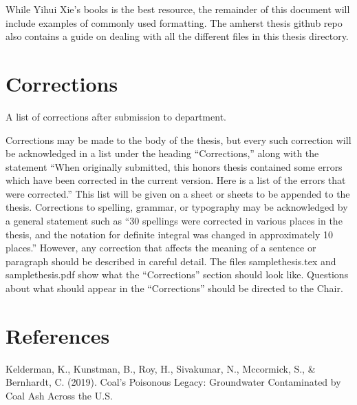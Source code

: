 \documentclass[12pt, twoside]{amherstthesis}
\newlength{\cslhangindent}
\newenvironment{cslreferences}%
  {\setlength{\parindent}{0pt}%
  \everypar{\setlength{\hangindent}{\cslhangindent}}\ignorespaces}%
  {\par}
\begin{document}
While Yihui Xie's books is the best resource, the remainder of this document will include examples of commonly used formatting. The amherst thesis github repo also contains a guide on dealing with all the different files in this thesis directory.

\hypertarget{corrections}{%
\chapter*{Corrections}\label{corrections}}

A list of corrections after submission to department.

Corrections may be made to the body of the thesis, but every such correction will be acknowledged in a list under the heading ``Corrections,'' along with the statement ``When originally submitted, this honors thesis contained some errors which have been corrected in the current version. Here is a list of the errors that were corrected.'' This list will be given on a sheet or sheets to be appended to the thesis. Corrections to spelling, grammar, or typography may be acknowledged by a general statement such as ``30 spellings were corrected in various places in the thesis, and the notation for definite integral was changed in approximately 10 places.'' However, any correction that affects the meaning of a sentence or paragraph should be described in careful detail. The files samplethesis.tex and samplethesis.pdf show what the ``Corrections'' section should look like. Questions about what should appear in the ``Corrections'' should be directed to the Chair.

\backmatter

\hypertarget{references}{%
\chapter*{References}\label{references}}

\noindent

\setlength{\parindent}{-0.20in}
\setlength{\leftskip}{0.20in}
\setlength{\parskip}{8pt}

\hypertarget{refs}{}
\begin{cslreferences}
\leavevmode\hypertarget{ref-Kelderman2019}{}%
Kelderman, K., Kunstman, B., Roy, H., Sivakumar, N., Mccormick, S., \& Bernhardt, C. (2019). Coal's Poisonous Legacy: Groundwater Contaminated by Coal Ash Across the U.S.
\end{cslreferences}
\end{document}
